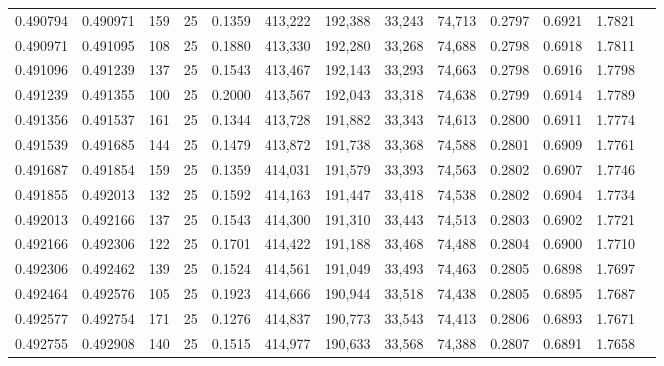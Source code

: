 \begin{tabular}{rrrrrrrrrrrrr}
0.490794 & 0.490971 &   159 &  25 &                                     0.1359 & 413,222 & 192,388 &  33,243 &  74,713 & 0.2797 & 0.6921 & 1.7821 \\
0.490971 & 0.491095 &   108 &  25 &                                     0.1880 & 413,330 & 192,280 &  33,268 &  74,688 & 0.2798 & 0.6918 & 1.7811 \\
0.491096 & 0.491239 &   137 &  25 &                                     0.1543 & 413,467 & 192,143 &  33,293 &  74,663 & 0.2798 & 0.6916 & 1.7798 \\
0.491239 & 0.491355 &   100 &  25 &                                     0.2000 & 413,567 & 192,043 &  33,318 &  74,638 & 0.2799 & 0.6914 & 1.7789 \\
0.491356 & 0.491537 &   161 &  25 &                                     0.1344 & 413,728 & 191,882 &  33,343 &  74,613 & 0.2800 & 0.6911 & 1.7774 \\
0.491539 & 0.491685 &   144 &  25 &                                     0.1479 & 413,872 & 191,738 &  33,368 &  74,588 & 0.2801 & 0.6909 & 1.7761 \\
0.491687 & 0.491854 &   159 &  25 &                                     0.1359 & 414,031 & 191,579 &  33,393 &  74,563 & 0.2802 & 0.6907 & 1.7746 \\
0.491855 & 0.492013 &   132 &  25 &                                     0.1592 & 414,163 & 191,447 &  33,418 &  74,538 & 0.2802 & 0.6904 & 1.7734 \\
0.492013 & 0.492166 &   137 &  25 &                                     0.1543 & 414,300 & 191,310 &  33,443 &  74,513 & 0.2803 & 0.6902 & 1.7721 \\
0.492166 & 0.492306 &   122 &  25 &                                     0.1701 & 414,422 & 191,188 &  33,468 &  74,488 & 0.2804 & 0.6900 & 1.7710 \\
0.492306 & 0.492462 &   139 &  25 &                                     0.1524 & 414,561 & 191,049 &  33,493 &  74,463 & 0.2805 & 0.6898 & 1.7697 \\
0.492464 & 0.492576 &   105 &  25 &                                     0.1923 & 414,666 & 190,944 &  33,518 &  74,438 & 0.2805 & 0.6895 & 1.7687 \\
0.492577 & 0.492754 &   171 &  25 &                                     0.1276 & 414,837 & 190,773 &  33,543 &  74,413 & 0.2806 & 0.6893 & 1.7671 \\
0.492755 & 0.492908 &   140 &  25 &                                     0.1515 & 414,977 & 190,633 &  33,568 &  74,388 & 0.2807 & 0.6891 & 1.7658 \\

\end{tabular}
